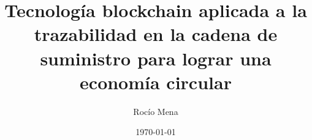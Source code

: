 \documentclass{article}
\title{Tecnología blockchain aplicada a la trazabilidad en la cadena de suministro para lograr una economía circular}
\author{Rocío Mena}
\date{\today}
\begin{document}
\maketitle











\nocite{*} %

\printbibliography %
\end{document}
